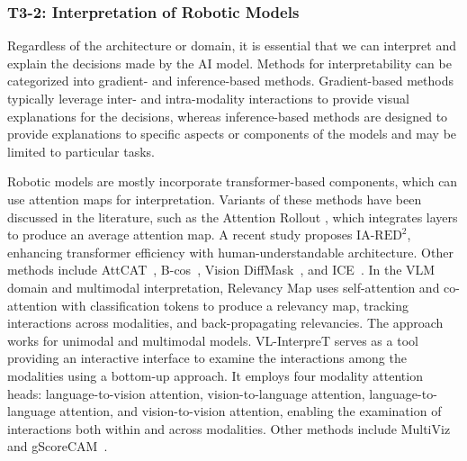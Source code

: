 \subsubsection{T3-2: Interpretation of Robotic Models} \label{sec:t3_2}

Regardless of the architecture or domain, it is essential that we can interpret and explain the decisions made by the AI model.
Methods for interpretability can be categorized into gradient- and inference-based methods. 
Gradient-based methods typically leverage inter- and intra-modality interactions to provide visual explanations for the decisions, whereas inference-based methods are designed to provide explanations to specific aspects or components of the models and may be limited to particular tasks.




Robotic models are mostly incorporate transformer-based components, which can use
attention maps for interpretation. 
Variants of these methods have been discussed in the literature, such as the Attention Rollout \cite{abnar2020quantifying}, which integrates layers to produce an average attention map. %
A recent study \cite{DBLP:journals/corr/abs-2106-12620} proposes $\text{IA-RED}^2$, enhancing transformer efficiency with human-understandable architecture.
Other methods include AttCAT~\cite{DBLP:conf/nips/QiangPLLJZ22}, B-cos~\cite{DBLP:journals/corr/abs-2301-08669}, Vision DiffMask~\cite{DBLP:conf/cvpr/NalmpantisPGPA23}, and ICE~\cite{DBLP:conf/cvpr/ChoiJH23}.
In the VLM domain and multimodal interpretation, Relevancy Map \cite{chefer2021generic} uses self-attention and co-attention with classification tokens to produce a relevancy map, tracking interactions across modalities, and back-propagating relevancies. The approach works for unimodal and multimodal models.
VL-InterpreT \cite{aflalo2022vl} serves as a tool providing an interactive interface to examine the interactions among the modalities using a bottom-up approach. It employs four modality attention heads: language-to-vision attention, vision-to-language attention, language-to-language attention, and vision-to-vision attention, enabling the examination of interactions both within and across modalities.
Other methods include MultiViz \cite{liang2022multiviz} and gScoreCAM~\cite{chen2022gscorecam}.
 



